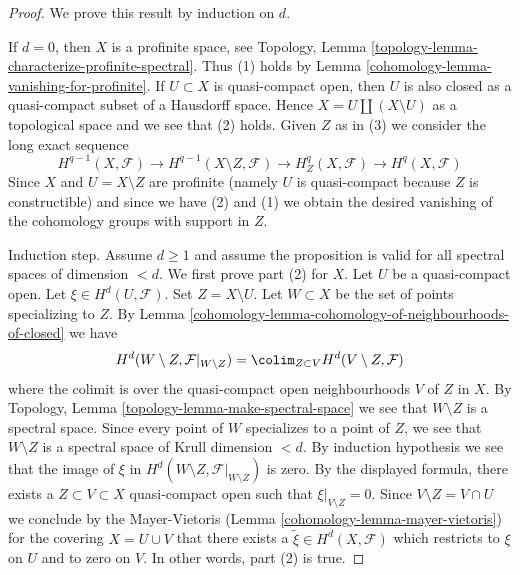\begin{proof}

We prove this result by induction on $d$.

\medskip\noindent
If $d = 0$, then $X$ is a profinite space, see
Topology, Lemma \ref{topology-lemma-characterize-profinite-spectral}.
Thus (1) holds by Lemma \ref{cohomology-lemma-vanishing-for-profinite}.
If $U \subset X$ is quasi-compact open, then $U$ is
also closed as a quasi-compact subset of a Hausdorff space.
Hence $X = U \amalg (X \setminus U)$ as a topological space
and we see that (2) holds. Given $Z$ as in (3) we consider the
long exact sequence
$$
H^{q - 1}(X, \mathcal{F}) \to
H^{q - 1}(X \setminus Z, \mathcal{F}) \to
H^q_Z(X, \mathcal{F}) \to H^q(X, \mathcal{F})
$$
Since $X$ and $U = X \setminus Z$ are profinite (namely $U$ is quasi-compact
because $Z$ is constructible) and since
we have (2) and (1) we obtain the desired vanishing of the
cohomology groups with support in $Z$.

\medskip\noindent
Induction step. Assume $d \geq 1$ and assume
the proposition is valid for all spectral
spaces of dimension $< d$. We first prove part (2) for $X$.
Let $U$ be a quasi-compact open. Let $\xi \in H^d(U, \mathcal{F})$.
Set $Z = X \setminus U$. Let $W \subset X$ be the set of points
specializing to $Z$. By
Lemma \ref{cohomology-lemma-cohomology-of-neighbourhoods-of-closed} we have
$$
H^d(W \setminus Z, \mathcal{F}|_{W \setminus Z}) =
\colim_{Z \subset V} H^d(V \setminus Z, \mathcal{F})
$$
where the colimit is over the quasi-compact open neighbourhoods $V$
of $Z$ in $X$.
By Topology, Lemma \ref{topology-lemma-make-spectral-space} we see that
$W \setminus Z$ is a spectral space.
Since every point of $W$ specializes to a point of $Z$, we see that
$W \setminus Z$ is a spectral space of Krull dimension $< d$.
By induction hypothesis we see that the image of $\xi$ in
$H^d(W \setminus Z, \mathcal{F}|_{W \setminus Z})$ is zero.
By the displayed formula, there exists a $Z \subset V \subset X$
quasi-compact open such that $\xi|_{V \setminus Z} = 0$.
Since $V \setminus Z = V \cap U$ we conclude by the Mayer-Vietoris
(Lemma \ref{cohomology-lemma-mayer-vietoris}) for the covering $X = U \cup V$
that there exists a $\tilde \xi \in H^d(X, \mathcal{F})$ which restricts
to $\xi$ on $U$ and to zero on $V$. In other words, part (2) is true.


\end{proof}
